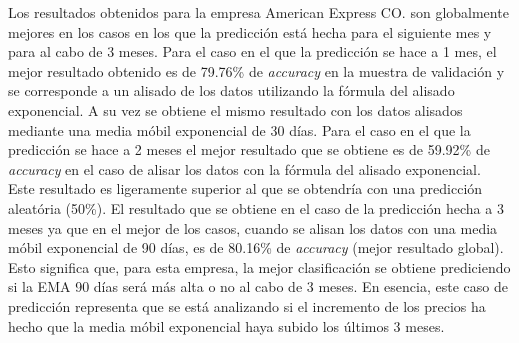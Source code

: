 \documentclass[]{article}
\begin{document}
Los resultados obtenidos para la empresa American Express CO. son
globalmente mejores en los casos en los que la predicción está hecha
para el siguiente mes y para al cabo de 3 meses. Para el caso en el que
la predicción se hace a 1 mes, el mejor resultado obtenido es de 79.76\%
de \emph{accuracy} en la muestra de validación y se corresponde a un
alisado de los datos utilizando la fórmula del alisado exponencial. A su
vez se obtiene el mismo resultado con los datos alisados mediante una
media móbil exponencial de 30 días. Para el caso en el que la predicción
se hace a 2 meses el mejor resultado que se obtiene es de 59.92\% de
\emph{accuracy} en el caso de alisar los datos con la fórmula del
alisado exponencial. Este resultado es ligeramente superior al que se
obtendría con una predicción aleatória (50\%). El resultado que se
obtiene en el caso de la predicción hecha a 3 meses ya que en el mejor
de los casos, cuando se alisan los datos con una media móbil exponencial
de 90 días, es de 80.16\% de \emph{accuracy} (mejor resultado global).
Esto significa que, para esta empresa, la mejor clasificación se obtiene
prediciendo si la EMA 90 días será más alta o no al cabo de 3 meses. En
esencia, este caso de predicción representa que se está analizando si el
incremento de los precios ha hecho que la media móbil exponencial haya
subido los últimos 3 meses.
\end{document}
